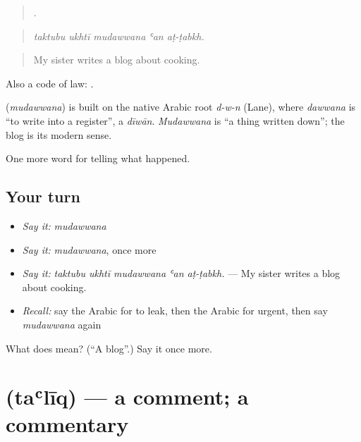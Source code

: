 \begin{quote}
    .
\end{quote}

\begin{quote}
\emph{taktubu ukhtī mudawwana ʿan aṭ-ṭabkh.}
\end{quote}

\begin{quote}
My sister writes a blog about cooking.
\end{quote}

Also a code of law:  .

\begin{cousinweb}
\textbf{} (\emph{mudawwana}) is built on the native Arabic root \emph{d-w-n} (Lane), where \emph{dawwana} is \textquotedblleft{}to write into a register\textquotedblright{}, a \emph{dīwān}. \emph{Mudawwana} is \textquotedblleft{}a thing written down\textquotedblright{}; the blog is its modern sense.
\end{cousinweb}

\begin{grammarlens}[title={What you've built}]
One more word for telling what happened.
\end{grammarlens}

\subsection*{Your turn}
\begin{itemize}
\raggedright
  \item \emph{Say it:} \emph{mudawwana}
  \item \emph{Say it:} \emph{mudawwana}, once more
  \item \emph{Say it:} \emph{taktubu ukhtī mudawwana ʿan aṭ-ṭabkh.} — My sister writes a blog about cooking.
  \item \emph{Recall:} say the Arabic for to leak, then the Arabic for urgent, then say \emph{mudawwana} again
\end{itemize}

\begin{tcolorbox}[breakable,colback=teal!4,colframe=teal!35!black,title={Before you move on}]
What does  mean? (\textquotedblleft{}A blog\textquotedblright{}.) Say it once more.
\end{tcolorbox}
\section[\texorpdfstring{\ar{تعليق} (taʿlīq)}{تعليق (taʿlīq)}]{ (taʿlīq) — a comment; a commentary}

